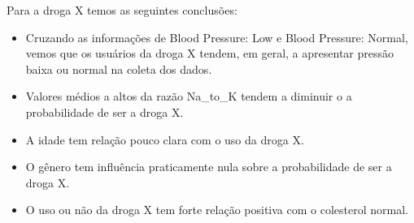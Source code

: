 \documentclass[12pt,a4paper]{article}
\theoremstyle{definition}
\theoremstyle{theoremdd}
\begin{document}
Para a droga X temos as seguintes conclusões:

\begin{itemize}
\item Cruzando as informações de Blood Pressure: Low e Blood Pressure: Normal, vemos que os usuários da droga X tendem, em geral, a apresentar pressão baixa ou normal na coleta dos dados.

\item Valores médios a altos da razão Na\_to\_K tendem a diminuir o a probabilidade de ser a droga X.

\item A idade tem relação pouco clara com o uso da droga X.

\item O gênero tem influência praticamente nula sobre a probabilidade de ser a droga X.

\item O uso ou não da droga X tem forte relação positiva com o colesterol normal.
\end{itemize}
\end{document}

